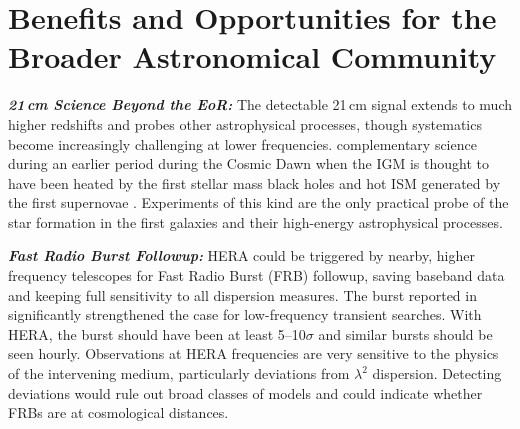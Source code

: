 \documentclass[preprint,11pt]{aastex}
\begin{document}


\vspace{-20pt}
\section{Benefits and Opportunities for the Broader Astronomical Community}
\vspace{-5pt}

\noindent \textbf{\textit{21\,cm Science Beyond the EoR:}} The detectable 21\,cm signal extends to much higher
redshifts and probes other astrophysical processes, though systematics become increasingly challenging at lower frequencies.
complementary science during an earlier period during the Cosmic Dawn when the IGM is thought to have
been heated by the first stellar mass black holes and hot ISM generated by the
first supernovae \citep{mesinger_et_al2013}. Experiments of this kind are the only practical probe of the star formation in the first galaxies and their high-energy astrophysical processes.

\noindent \textbf{\textit{Fast Radio Burst Followup:}} 
HERA could be triggered by nearby, higher frequency telescopes for Fast Radio Burst (FRB) followup, saving baseband data and keeping full sensitivity to all dispersion measures. 
The burst reported
in \citet{masui_et_al2015} significantly strengthened the case for
low-frequency transient searches.  
With HERA, the burst
should have been at least 5--10$\sigma$ %
 and similar bursts should be seen hourly.
 Observations at HERA frequencies are very sensitive to the physics of
the intervening medium, particularly deviations from $\lambda^2$
dispersion. Detecting deviations would rule out broad classes of models and could indicate whether FRBs are at cosmological distances.

\end{document}
